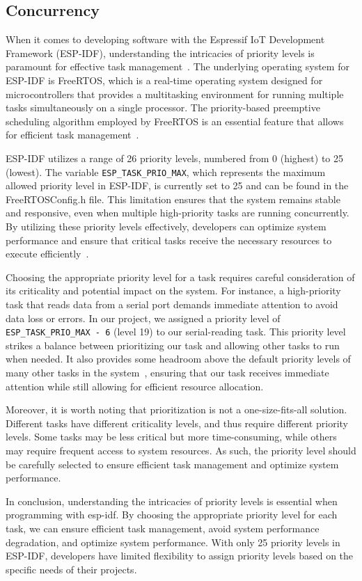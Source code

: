 \subsection{Concurrency}

When it comes to developing software with the Espressif IoT Development Framework (ESP-IDF), understanding the intricacies of priority levels is paramount for effective task management~\cite{Davis:2016}. The underlying operating system for ESP-IDF is FreeRTOS, which is a real-time operating system designed for microcontrollers that provides a multitasking environment for running multiple tasks simultaneously on a single processor. The priority-based preemptive scheduling algorithm employed by FreeRTOS is an essential feature that allows for efficient task management~\cite{espressif:esp-idf-programming-guide}.

ESP-IDF utilizes a range of 26 priority levels, numbered from 0 (highest) to 25 (lowest). The variable \texttt{ESP\_TASK\_PRIO\_MAX}, which represents the maximum allowed priority level in ESP-IDF, is currently set to 25 and can be found in the FreeRTOSConfig.h file\cite{espressif:freertosconfig}. This limitation ensures that the system remains stable and responsive, even when multiple high-priority tasks are running concurrently. By utilizing these priority levels effectively, developers can optimize system performance and ensure that critical tasks receive the necessary resources to execute efficiently~\cite{espressif:esp-idf-programming-guide}.

Choosing the appropriate priority level for a task requires careful consideration of its criticality and potential impact on the system. For instance, a high-priority task that reads data from a serial port demands immediate attention to avoid data loss or errors. In our project, we assigned a priority level of \texttt{ESP\_TASK\_PRIO\_MAX - 6} (level 19) to our serial-reading task. This priority level strikes a balance between prioritizing our task and allowing other tasks to run when needed. It also provides some headroom above the default priority levels of many other tasks in the system~\cite{espressif:esp-idf-programming-guide}, ensuring that our task receives immediate attention while still allowing for efficient resource allocation.

Moreover, it is worth noting that prioritization is not a one-size-fits-all solution. Different tasks have different criticality levels, and thus require different priority levels. Some tasks may be less critical but more time-consuming, while others may require frequent access to system resources. As such, the priority level should be carefully selected to ensure efficient task management and optimize system performance.

In conclusion, understanding the intricacies of priority levels is essential when programming with esp-idf. By choosing the appropriate priority level for each task, we can ensure efficient task management, avoid system performance degradation, and optimize system performance. With only 25 priority levels in ESP-IDF, developers have limited flexibility to assign priority levels based on the specific needs of their projects.
